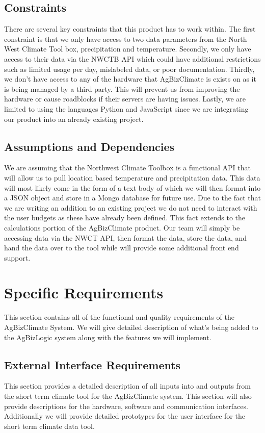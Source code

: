 \documentclass[onecolumn, draftclsnofoot,10pt, compsoc]{article}
\begin{document}
	\subsection{Constraints}
		There are several key constraints that this product has to work within. The first constraint is that we only have access to two data parameters from the North West Climate Tool box, precipitation and temperature. Secondly, we only have access to their data via the NWCTB API which could have additional restrictions such as limited usage per day, mislabeled data, or poor documentation. Thirdly, we don’t have access to any of the hardware that AgBizClimate is exists on as it is being managed by a third party. This will prevent us from improving the hardware or cause roadblocks if their servers are having issues. Lastly, we are limited to using the languages Python and JavaScript since we are integrating our product into an already existing project.\\
	
	\subsection {Assumptions and Dependencies}
		We are assuming that the Northwest Climate Toolbox is a functional API that will allow us to pull location based temperature and precipitation data. This data will most likely come in the form of a text body of which we will then format into a JSON object and store in a Mongo database for future use. Due to the fact that we are writing an addition to an existing project we do not need to interact with the user budgets as these have already been defined. This fact extends to the calculations portion of the AgBizClimate product. Our team will simply be accessing data via the NWCT API, then format the data, store the data, and hand the data over to the tool while will provide some additional front end support.\\

\section{Specific Requirements}
This section contains all of the functional and quality requirements of the AgBizClimate System. We will give detailed description of what's being added to the AgBizLogic system along with the features we will implement.\\
    \subsection{External Interface Requirements}
		This section provides a detailed description of all inputs into and outputs from the short term climate tool for the AgBizClimate system. This section will also provide descriptions for the hardware, software and communication interfaces. Additionally we will provide detailed prototypes for the user interface for the short term climate data tool.\\
\end{document}
